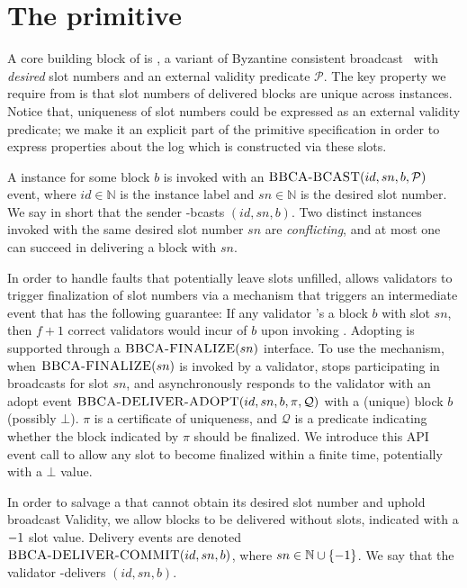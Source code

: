 \section{The \primitive primitive}
\label{sec:bbca}

A core building block of \system is \primitive, 
a variant of Byzantine consistent broadcast~\cite{CachinGR11}
with \emph{desired} slot numbers and an external validity predicate $\mathcal{P}$.
The key property we require from \primitive is that slot numbers of delivered blocks are unique across \primitive instances.
Notice that, uniqueness of slot numbers could be expressed as an external validity predicate; 
we make it an explicit part of the primitive specification in order to express properties about the log which is constructed via these slots.

A \primitive instance for some block $b$ is invoked with an
$\textsc{BBCA-BCAST}(id, sn, b, \mathcal{P})$ event, where $id\in\mathbb{N}$ is the instance label
and $sn\in\mathbb{N}$ is the desired slot number.
We say in short that the sender \primitivesmall-bcasts $(id, sn, b)$.
Two distinct instances invoked with the same desired slot number $sn$ are \emph{conflicting}, 
and at most one can succeed in delivering a block with $sn$.

In order to handle faults that potentially leave slots unfilled,
\primitive allows validators to trigger finalization of slot numbers via a \finalize mechanism that triggers an intermediate \bbcaadopt event that has the following guarantee:
If any validator \bbcadeliver's a block $b$ with slot $sn$, 
then $f+1$ correct validators would incur \bbcaadopt of $b$ upon invoking \finalize.
Adopting is supported through a $\textsc{BBCA-FINALIZE}(sn)$ interface.
To use the \finalize mechanism, when $\textsc{BBCA-FINALIZE}(sn)$ is invoked by a validator,
\primitive stops participating in broadcasts for slot $sn$, and
asynchronously responds to the validator with an adopt event
$\textsc{BBCA-DELIVER-ADOPT}(id, sn, b, \pi, \mathcal{Q})$ with a (unique) block $b$ (possibly $\bot$). 
$\pi$ is a certificate of uniqueness, and $\mathcal{Q}$ is a predicate indicating whether the block indicated by $\pi$ should be finalized.
We introduce this API event call to allow any \system slot to become finalized within a finite time, potentially with a $\bot$ value.

In order to salvage a \primitive that cannot obtain its desired slot number and uphold broadcast Validity, 
we allow blocks to be delivered without slots, indicated with a $-1$ slot value.
Delivery events are denoted $\textsc{BBCA-DELIVER-COMMIT}(id, sn, b)$, where $sn\in\mathbb{N}\cup\{-1\}$.
We say that the validator \primitivesmall-delivers $(id, sn, b)$.

